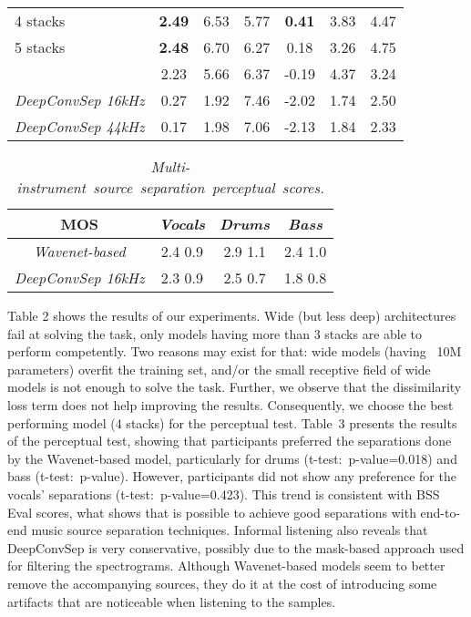 \documentclass[a4paper]{article}
\begin{document}
\begin{table}[!h]
{\begin{tabular}{c c c c c c c}
			\multicolumn{1}{l}{4 stacks} & \textbf{2.49} & 6.53 & 5.77 & \multicolumn{1}{|c}{\textbf{0.41}} & 3.83 & 4.47\\
			\multicolumn{1}{l}{5 stacks} & \textbf{2.48} & 6.70 & 6.27 & \multicolumn{1}{|c}{0.18} &  3.26 &  4.75\\ \hdashline
			\multicolumn{1}{l}{4 stacks + } & 2.23 & 5.66 & 6.37 & \multicolumn{1}{|c}{-0.19} & 4.37 & 3.24\\ \hline
			\multicolumn{1}{l}{\textit{{DeepConvSep 16kHz}}} & 0.27 & 1.92 & 7.46 & \multicolumn{1}{|c}{-2.02} & 1.74 & 2.50\\
			\multicolumn{1}{l}{\textit{{DeepConvSep 44kHz}}} & 0.17 & 1.98 & 7.06 & \multicolumn{1}{|c}{-2.13} & 1.84 & 2.33\\
	\end{tabular}}
    \vspace{-3mm}
\end{table}

\begin{table}[!h]
	\centering
	\caption{\textit{\mbox{Multi-instrument source separation perceptual scores.}}}	
	\vspace{-2mm}	
	\small {\begin{tabular}{cccc}
			\textbf{MOS} & \textbf{\textit{Vocals}} & \textbf{\textit{Drums}} & \textbf{\textit{Bass}} \\ \hline
			\textit{Wavenet-based} & 2.4  0.9 & 2.9  1.1 & 2.4  1.0 \\ 
			\textit{DeepConvSep 16kHz} & 2.3  0.9 & 2.5  0.7 & 1.8  0.8 \\ 	
	\end{tabular}}
	\vspace{-6mm}
\end{table}	



Table 2 shows the results of our experiments. Wide (but less deep) architectures fail at solving the task, only models having more than 3 stacks are able to perform competently. Two reasons may exist for that: wide models (having ~10M parameters) overfit the training set, and/or the small receptive field of wide models is not enough to solve the task. Further, we observe that the dissimilarity loss term  does not help improving the results.
Consequently, we choose the best performing model (4 stacks) for the perceptual test.
Table~3 presents the results of the perceptual test, showing that participants preferred the separations done by the Wavenet-based model, particularly for drums \mbox{(t-test: p-value=0.018)} and bass \mbox{(t-test: p-value)}. However, participants did not show any preference for the vocals' separations \mbox{(t-test: p-value=0.423).} This trend is consistent with BSS Eval scores, what shows that is possible to achieve good separations with end-to-end music source separation techniques.
Informal listening also reveals that DeepConvSep is very conservative, possibly due to the mask-based approach used for filtering the spectrograms. Although Wavenet-based models seem to better remove the accompanying sources, they do it at the cost of introducing some artifacts that are noticeable when listening to the samples. 
\end{document}
